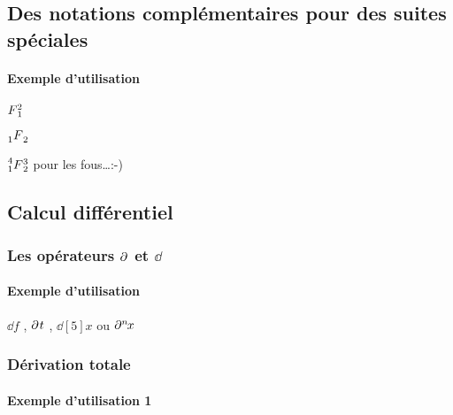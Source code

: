 \documentclass[12pt,a4paper]{article}
\theoremstyle{definition}
\begin{document}
\subsection{Des notations complémentaires pour des suites spéciales}

\paragraph{Exemple d'utilisation}

\begin{latexex}
$\seqplus{F}{1}{2}$

$\seqhypergeo{F}{1}{2}$

$\seqsuprageo{F}{1}{2}{3}{4}$
pour les fous\dots :-)
\end{latexex}



\subsection{Calcul différentiel}

\subsubsection{\texorpdfstring{Les opérateurs $\pp{}$ et $\dd{}$}%
                               {Les opérateurs "d rond" et "d droit"}}

\paragraph{Exemple d'utilisation}

\begin{latexex}
$\dd{f}$ , $\pp{t}$ ,
$\dd[5]{x}$ ou $\pp[n]{x}$
\end{latexex}




\subsubsection{Dérivation totale}

\paragraph{Exemple d'utilisation 1}
\end{document}
